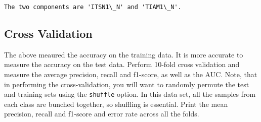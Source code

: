 \documentclass[11pt]{article}
\begin{document}
    \begin{Verbatim}[commandchars=\\\{\}]
The two components are 'ITSN1\_N' and 'TIAM1\_N'.

    \end{Verbatim}

    \hypertarget{cross-validation}{%
\subsection{Cross Validation}\label{cross-validation}}

The above meaured the accuracy on the training data. It is more accurate
to measure the accuracy on the test data. Perform 10-fold cross
validation and measure the average precision, recall and f1-score, as
well as the AUC. Note, that in performing the cross-validation, you will
want to randomly permute the test and training sets using the
\texttt{shuffle} option. In this data set, all the samples from each
class are bunched together, so shuffling is essential. Print the mean
precision, recall and f1-score and error rate across all the folds.
\end{document}
